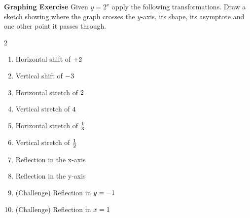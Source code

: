 \textbf{Graphing Exercise} Given $y =2^{x}$ apply the following transformations. Draw a sketch showing where the graph crosses the $y$-axis, its shape, its asymptote and one other point it passes through. 

\columnseprule =0.4pt
\begin {multicols}{2}
\begin{enumerate}
	\item Horizontal shift of $ +2\vspace{+2.000000cm}$ 
	
	\item Vertical shift of $ -3\vspace{+2.000000cm}$ 
	
	\item Horizontal stretch of $2\vspace{+2.000000cm}$ 
	
	\item Vertical stretch of $4\vspace{+2.000000cm}$ 
	
	\item Horizontal stretch of $\frac{1}{3}\vspace{+2.000000cm}$ 
	
	\item Vertical stretch of $\frac{1}{2}\vspace{+2.000000cm}$ 
	
	\item Reflection in the x-axis\vspace{2cm}
	
	
	\item Reflection in the y-axis\vspace{2cm} 
	
	\item (Challenge) Reflection in $y = -1\vspace{+2.000000cm}$ 
	
	\item (Challenge) Reflection in $x =1\vspace{+4.000000cm}$ \end{enumerate}

\end {multicols}
\columnseprule =0pt
\medskip\medskip\medskip\medskip

